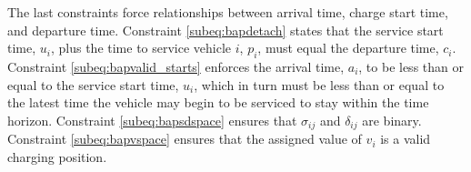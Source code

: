 The last constraints force relationships between arrival time, charge start time, and departure time. Constraint
\eqref{subeq:bapdetach} states that the service start time, $u_i$, plus the time to service vehicle $i$, $p_i$, must
equal the departure time, $c_i$. Constraint \eqref{subeq:bapvalid_starts} enforces the arrival time, $a_i$, to be less
than or equal to the service start time, $u_i$, which in turn must be less than or equal to the latest time the vehicle
may begin to be serviced to stay within the time horizon. Constraint \eqref{subeq:bapsdspace} ensures that $\sigma_{ij}$ and
$\delta_{ij}$ are binary. Constraint \eqref{subeq:bapvspace} ensures that the assigned value of $v_i$ is a valid charging
position.
